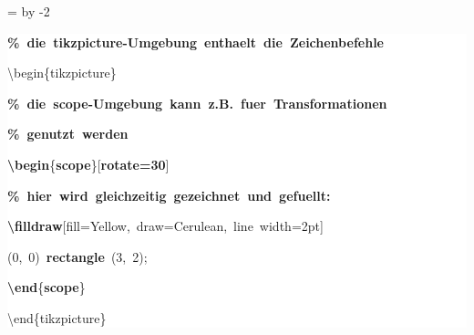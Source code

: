 \begingroup
\ttfamily
{}
=\textwidth
\advance{} by -2\fboxsep
\noindent
\colorbox{background}
{%
\parbox{\dimen255}
{%
\rule[-0.5ex]{0pt}{2.5ex}\hspace*{0.0em}\textcolor{G}{\textbf{\%~die~tikzpicture{-}Umgebung~enthaelt~die~Zeichenbefehle}}\\
\rule[-0.5ex]{0pt}{2.5ex}\hspace*{0.0em}\textbackslash{}begin\{tikzpicture\}\\
\rule[-0.5ex]{0pt}{2.5ex}\hspace*{1.0em}\textcolor{G}{\textbf{\%~die~scope{-}Umgebung~kann~z.B.~fuer~Transformationen}}\\
\rule[-0.5ex]{0pt}{2.5ex}\hspace*{1.0em}\textcolor{G}{\textbf{\%~genutzt~werden}}\\
\rule[-0.5ex]{0pt}{2.5ex}\hspace*{1.0em}\textcolor{R}{\textbf{\textbackslash{}begin}}\{\textcolor{R}{\textbf{scope}}\}[\textcolor{R}{\textbf{rotate=30}}]\\
\rule[-0.5ex]{0pt}{2.5ex}\hspace*{2.0em}\textcolor{G}{\textbf{\%~hier~wird~gleichzeitig~gezeichnet~und~gefuellt:}}\\
\rule[-0.5ex]{0pt}{2.5ex}\hspace*{2.0em}\textcolor{R}{\textbf{\textbackslash{}filldraw}}[fill=Yellow,~draw=Cerulean,~line~width=2pt]\\
\rule[-0.5ex]{0pt}{2.5ex}\hspace*{6.5em}(0,~0)~\textcolor{R}{\textbf{rectangle}}~(3,~2);\\
\rule[-0.5ex]{0pt}{2.5ex}\hspace*{1.0em}\textcolor{R}{\textbf{\textbackslash{}end}}\{\textcolor{R}{\textbf{scope}}\}\\
\rule[-0.5ex]{0pt}{2.5ex}\hspace*{0.0em}\textbackslash{}end\{tikzpicture\}}%
}%
\endgroup
